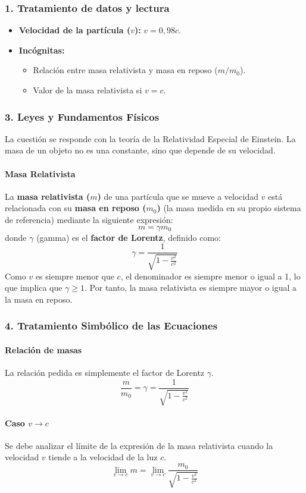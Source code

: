 \subsubsection*{1. Tratamiento de datos y lectura}
\begin{itemize}
    \item \textbf{Velocidad de la partícula ($v$):} $v = 0,98c$.
    \item \textbf{Incógnitas:}
        \begin{itemize}
            \item Relación entre masa relativista y masa en reposo ($m/m_0$).
            \item Valor de la masa relativista si $v=c$.
        \end{itemize}
\end{itemize}

\subsubsection*{3. Leyes y Fundamentos Físicos}
La cuestión se responde con la teoría de la Relatividad Especial de Einstein. La masa de un objeto no es una constante, sino que depende de su velocidad.
\paragraph{Masa Relativista}
La \textbf{masa relativista ($m$)} de una partícula que se mueve a velocidad $v$ está relacionada con su \textbf{masa en reposo ($m_0$)} (la masa medida en su propio sistema de referencia) mediante la siguiente expresión:
$$ m = \gamma m_0 $$
donde $\gamma$ (gamma) es el \textbf{factor de Lorentz}, definido como:
$$ \gamma = \frac{1}{\sqrt{1 - \frac{v^2}{c^2}}} $$
Como $v$ es siempre menor que $c$, el denominador es siempre menor o igual a 1, lo que implica que $\gamma \ge 1$. Por tanto, la masa relativista es siempre mayor o igual a la masa en reposo.

\subsubsection*{4. Tratamiento Simbólico de las Ecuaciones}
\paragraph{Relación de masas}
La relación pedida es simplemente el factor de Lorentz $\gamma$.
$$ \frac{m}{m_0} = \gamma = \frac{1}{\sqrt{1 - \frac{v^2}{c^2}}} $$
\paragraph{Caso $v \to c$}
Se debe analizar el límite de la expresión de la masa relativista cuando la velocidad $v$ tiende a la velocidad de la luz $c$.
$$ \lim_{v \to c} m = \lim_{v \to c} \frac{m_0}{\sqrt{1 - \frac{v^2}{c^2}}} $$

